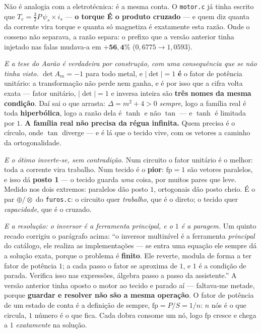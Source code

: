 \documentclass[11pt]{article}
\newcommand{\code}[1]{\texttt{\small #1}}
\theoremstyle{plain}
\theoremstyle{remark}
\begin{document}
\begin{itemize}
Não é analogia com a eletrotécnica: é a mesma conta. O \code{motor.c} já tinha escrito que
$T_e = \tfrac{3}{2}P\,\psi_s \times i_s$ --- \textbf{o torque É o produto cruzado} --- e quem diz
quanta da corrente vira torque e quanta só magnetiza é exatamente esta razão. Onde o cosseno não
separava, a razão separa: o prefixo que a versão anterior tinha injetado nas falas mudava-a em $\mathbf{+56{,}4\%}$
($0{,}6775 \to 1{,}0593$).

\emph{E a tese do Aarão é verdadeira por construção, com uma consequência que se não tinha visto.}
$\det A_m = -1$ para todo metal, e $|\det| = 1$ \textbf{é} o fator de potência unitário: a
transformação não perde nem ganha, e é por isso que a cifra volta exata --- fator unitário,
$|\det|=1$ e inversa inteira são \textbf{três nomes da mesma condição}. Daí sai o que arrasta:
$\Delta = m^2+4 > 0$ \emph{sempre}, logo a família real é toda \textbf{hiperbólica}, logo a razão
dela é $\tanh$ e não $\tan$ --- e $\tanh$ é limitada por $1$. \textbf{A família real não precisa da
régua infinita.} Quem precisa é o círculo, onde $\tan$ diverge --- e é lá que o tecido vive, com os
vetores a caminho da ortogonalidade.

\emph{E o ótimo inverte-se, sem contradição.} Num circuito o fator unitário é o melhor: toda a
corrente vira trabalho. Num tecido é o \textbf{pior}: $\mathrm{fp} = 1$ são vetores paralelos, e
isso dá \textbf{posto 1} --- o tecido guarda \emph{uma} coisa, por muitos pares que leve. Medido nos
dois extremos: paralelos dão posto $1$, ortogonais dão posto cheio. É o par $\oplus/\otimes$ do
\code{furos.c}: o circuito quer \emph{trabalho}, que é o direto; o tecido quer \emph{capacidade},
que é o cruzado.

\emph{E a resolução: o inversor é a ferramenta principal, e o $1$ é a paragem.} Um quinto recado
corrigiu o parágrafo acima: ``o inversor multinível é a ferramenta \emph{principal} do catálogo, ele
realiza as implementações --- se entra uma equação ele sempre dá a solução exata, porque o problema
é \textbf{finito}. Ele reverte, modula de forma a ter fator de potência $1$; a cada passo o fator se
aproxima de $1$, e $1$ é a condição de parada. Verifica isso nas expressões, álgebra passo a passo
da assistente.'' A versão anterior tinha oposto o motor ao tecido e parado aí --- faltava-me metade, porque
\textbf{guardar e resolver não são a mesma operação}. O fator de potência de um estado de conta é a
definição de sempre, $\mathrm{fp} = P/S = 1/n$: $n$ nós é o que circula, $1$ número é o que fica.
Cada dobra consome um nó, logo $\mathrm{fp}$ cresce e chega a $1$ \emph{exatamente} na solução.


\end{itemize}
\end{document}
